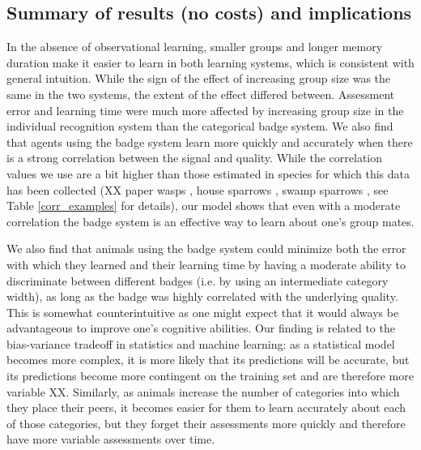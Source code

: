 \subsection*{Summary of results (no costs) and implications} %
In the absence of observational learning, smaller groups and longer memory duration make it easier to learn in both learning systems, which is consistent with general intuition. While the sign of the effect of increasing group size was the same in the two systems, the extent of the effect differed between. Assessment error and learning time were much more affected by increasing group size in the individual recognition system than the categorical badge system. We also find that agents using the badge system learn more quickly and accurately when there is a strong correlation between the signal and quality. While the correlation values we use are a bit higher than those estimated in species for which this data has been collected (XX  paper wasps \cite{Tibbetts:2004kx}, house sparrows \cite{Veiga:1993fk}, swamp sparrows \cite{Olsen:2010uq}, see Table \ref{corr_examples} for details), our model shows that even with a moderate correlation the badge system is an effective way to learn about one's group mates. 


We also find that animals using the badge system could minimize both the error with which they learned and their learning time by having a moderate ability to discriminate between different badges (i.e. by using an intermediate category width), as long as the badge was highly correlated with the underlying quality. This is somewhat counterintuitive as one might expect that it would always be advantageous to improve one's cognitive abilities. Our finding is related to the bias-variance tradeoff in statistics and machine learning: as a statistical model becomes more complex, it is more likely that its predictions will be accurate, but its predictions become more contingent on the training set and are therefore more variable XX. Similarly, as animals increase the number of categories into which they place their peers, it becomes easier for them to learn accurately about each of those categories, but they forget their assessments more quickly and therefore have more variable assessments over time. 

